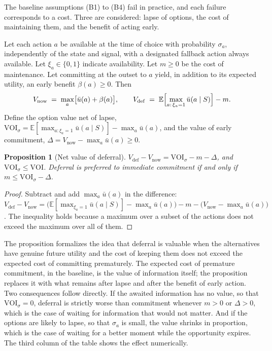 \documentclass[11pt]{article}
\newtheorem{proposition}{Proposition}
\theoremstyle{remark}
\newcommand{\E}{\mathbb{E}}
\begin{document}
The baseline assumptions (B1) to (B4) fail in practice, and each failure corresponds to a cost. Three are considered: lapse of options, the cost of maintaining them, and the benefit of acting early.

Let each action $a$ be available at the time of choice with probability $\sigma_a$, independently of the state and signal, with a designated fallback action always available. Let $\xi_a\in\{0,1\}$ indicate availability. Let $m\ge0$ be the cost of maintenance. Let committing at the outset to $a$ yield, in addition to its expected utility, an early benefit $\beta(a)\ge0$. Then
\[
V_{\mathrm{now}} \;=\; \max_{a}\bigl[\bar u(a)+\beta(a)\bigr],\qquad
V_{\mathrm{def}} \;=\; \E\Bigl[\max_{a:\,\xi_a=1}\bar u(a\mid S)\Bigr]-m.
\]
Define the option value net of lapse, $\mathrm{VOI}_\sigma=\E[\max_{a:\xi_a=1}\bar u(a\mid S)]-\max_a\bar u(a)$, and the value of early commitment, $\Delta=V_{\mathrm{now}}-\max_a\bar u(a)\ge0$.

\begin{proposition}[Net value of deferral]
$V_{\mathrm{def}}-V_{\mathrm{now}}=\mathrm{VOI}_\sigma-m-\Delta$, and $\mathrm{VOI}_\sigma\le\mathrm{VOI}$. Deferral is preferred to immediate commitment if and only if $m\le\mathrm{VOI}_\sigma-\Delta$.
\end{proposition}

\begin{proof}
Subtract and add $\max_a\bar u(a)$ in the difference: $V_{\mathrm{def}}-V_{\mathrm{now}}=\bigl(\E[\max_{\xi_a=1}\bar u(a\mid S)]-\max_a\bar u(a)\bigr)-m-\bigl(V_{\mathrm{now}}-\max_a\bar u(a)\bigr)$. The inequality holds because a maximum over a subset of the actions does not exceed the maximum over all of them.
\end{proof}

The proposition formalizes the idea that deferral is valuable when the alternatives have genuine future utility and the cost of keeping them does not exceed the expected cost of committing prematurely. The expected cost of premature commitment, in the baseline, is the value of information itself; the proposition replaces it with what remains after lapse and after the benefit of early action. Two consequences follow directly. If the awaited information has no value, so that $\mathrm{VOI}_\sigma=0$, deferral is strictly worse than commitment whenever $m>0$ or $\Delta>0$, which is the case of waiting for information that would not matter. And if the options are likely to lapse, so that $\sigma_a$ is small, the value shrinks in proportion, which is the case of waiting for a better moment while the opportunity expires. The third column of the table shows the effect numerically.
\end{document}
